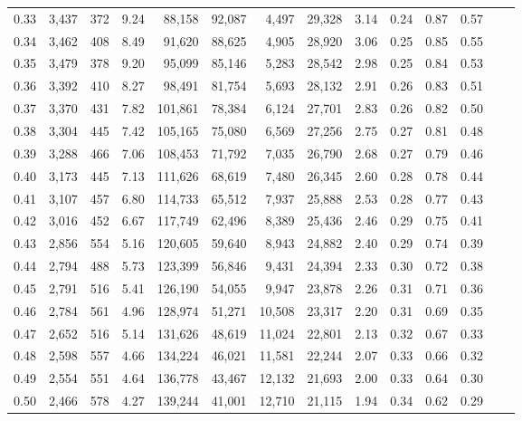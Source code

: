 \begin{tabular}{rrrrrrrrrrrrrr}
0.33 &  3,437 &  372 &    9.24 &   88,158 &   92,087 &   4,497 &  29,328 &  3.14 &  0.24 &  0.87 &      0.57 \\
0.34 &  3,462 &  408 &    8.49 &   91,620 &   88,625 &   4,905 &  28,920 &  3.06 &  0.25 &  0.85 &      0.55 \\
0.35 &  3,479 &  378 &    9.20 &   95,099 &   85,146 &   5,283 &  28,542 &  2.98 &  0.25 &  0.84 &      0.53 \\
0.36 &  3,392 &  410 &    8.27 &   98,491 &   81,754 &   5,693 &  28,132 &  2.91 &  0.26 &  0.83 &      0.51 \\
0.37 &  3,370 &  431 &    7.82 &  101,861 &   78,384 &   6,124 &  27,701 &  2.83 &  0.26 &  0.82 &      0.50 \\
0.38 &  3,304 &  445 &    7.42 &  105,165 &   75,080 &   6,569 &  27,256 &  2.75 &  0.27 &  0.81 &      0.48 \\
0.39 &  3,288 &  466 &    7.06 &  108,453 &   71,792 &   7,035 &  26,790 &  2.68 &  0.27 &  0.79 &      0.46 \\
0.40 &  3,173 &  445 &    7.13 &  111,626 &   68,619 &   7,480 &  26,345 &  2.60 &  0.28 &  0.78 &      0.44 \\
0.41 &  3,107 &  457 &    6.80 &  114,733 &   65,512 &   7,937 &  25,888 &  2.53 &  0.28 &  0.77 &      0.43 \\
0.42 &  3,016 &  452 &    6.67 &  117,749 &   62,496 &   8,389 &  25,436 &  2.46 &  0.29 &  0.75 &      0.41 \\
0.43 &  2,856 &  554 &    5.16 &  120,605 &   59,640 &   8,943 &  24,882 &  2.40 &  0.29 &  0.74 &      0.39 \\
0.44 &  2,794 &  488 &    5.73 &  123,399 &   56,846 &   9,431 &  24,394 &  2.33 &  0.30 &  0.72 &      0.38 \\
0.45 &  2,791 &  516 &    5.41 &  126,190 &   54,055 &   9,947 &  23,878 &  2.26 &  0.31 &  0.71 &      0.36 \\
0.46 &  2,784 &  561 &    4.96 &  128,974 &   51,271 &  10,508 &  23,317 &  2.20 &  0.31 &  0.69 &      0.35 \\
0.47 &  2,652 &  516 &    5.14 &  131,626 &   48,619 &  11,024 &  22,801 &  2.13 &  0.32 &  0.67 &      0.33 \\
0.48 &  2,598 &  557 &    4.66 &  134,224 &   46,021 &  11,581 &  22,244 &  2.07 &  0.33 &  0.66 &      0.32 \\
0.49 &  2,554 &  551 &    4.64 &  136,778 &   43,467 &  12,132 &  21,693 &  2.00 &  0.33 &  0.64 &      0.30 \\
0.50 &  2,466 &  578 &    4.27 &  139,244 &   41,001 &  12,710 &  21,115 &  1.94 &  0.34 &  0.62 &      0.29 \\

\end{tabular}
